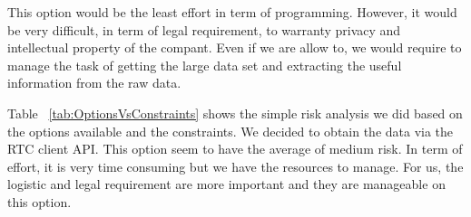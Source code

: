 \begin{description}
This option would be the least effort in term of programming. However, it would
be very difficult, in term of legal requirement, to warranty privacy and
intellectual property of the compant. Even if we are allow to, we would require
to manage the task of getting the large data set and extracting the useful
information from the raw data.

\end{description}

Table ~\ref{tab:OptionsVsConstraints} shows the simple risk analysis we did based on the options available and the constraints. We decided to obtain the data via the RTC client API. This option seem to have the average of medium risk. In term of effort, it is very time consuming but we have the resources to manage. For us, the logistic and legal requirement are more important and they are manageable on this option.
